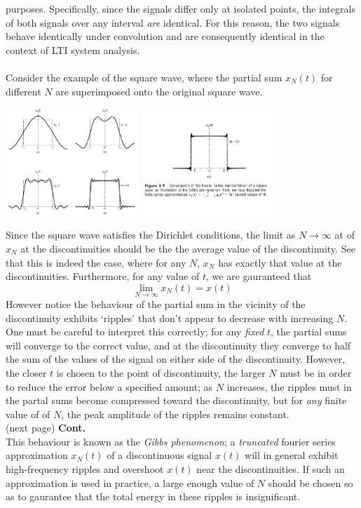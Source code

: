 \documentclass{report}
\begin{document}
purposes. Specifically, since the signals differ only at isolated points, the integrals of both signals over any interval \textit{are} identical. For this reason, the two signals behave identically under
convolution and are consequently identical in the context of LTI system analysis.\\
\vspace{1mm}\\
Consider the example of the square wave, where the partial sum $x_N(t)$ for different $N$ are superimposed onto the original square wave.
\begin{center}
\includegraphics[width=5cm]{a61}
\includegraphics[width=5cm]{a62}
\end{center}
Since the square wave satisfies the Dirichlet conditions, the limit as $N\to\infty$ at of $x_N$ at the discontinuities should be the the average value of the discontinuity. See that this is indeed the
case, where for any $N$, $x_N$ has exactly that value at the discontinuities. Furthermore, for any value of $t$, we are gauranteed that
\begin{equation*}
\lim_{N\to\infty}x_N(t)=x(t)
\end{equation*}
However notice the behaviour of the partial sum in the vicinity of the discontinuity exhibits `ripples' that don't appear to decrease with increasing $N$. One must be careful to interpret this correctly; 
for any \textit{fixed} $t$, the partial sums will converge to the correct value, and at the discontinuity they converge to half the sum of the values of the signal on either side of the discontinuity. 
However, the closer $t$ is chosen to the point of discontinuity, the larger $N$ must be in order to reduce the error below a specified amount; as $N$ increases, the ripples must in the partal sums
become compressed toward the discontinuity, but for \textit{any} finite value of of $N$, the peak amplitude of the ripples remains constant.\\
(next page)\newpage
\noindent\textbf{Cont.}\\
This behaviour is known as the \textit{Gibbs phenomenon}; a \textit{truncated} fourier series approximation $x_N(t)$ of a discontinuous signal $x(t)$ will in general exhibit high-frequency ripples and 
overshoot $x(t)$ near the discontinuities. If such an approximation is used in practice, a large enough value of $N$ should be chosen so as to gaurantee that the total energy in these ripples is 
insignificant. 
\newpage
\end{document}
